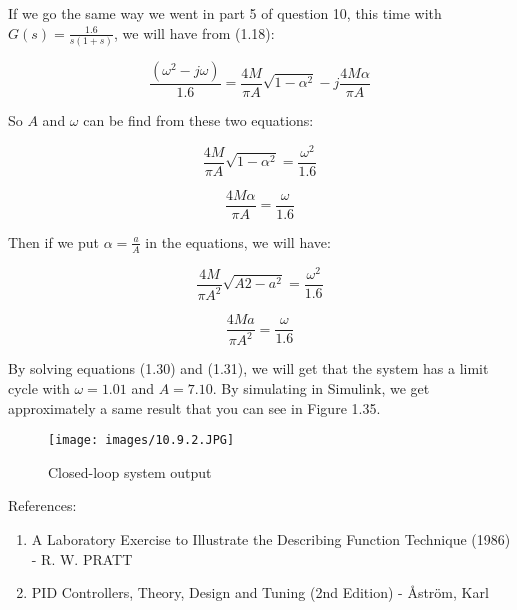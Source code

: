 \documentclass[11pt]{scrartcl} %
\begin{document}
 If we go the same way we went in part 5 of question 10, this time with $G(s)=\frac{1.6}{s(1+s)}$, we will have from (1.18):

\begin{equation}
    \frac{(\omega ^2 - j\omega)}{1.6} =  \frac{4M}{\pi A} \sqrt{1-\alpha ^2} - j\frac{4M\alpha}{\pi A}
\end{equation}

So $A$ and $\omega$ can be find from these two equations:

\begin{equation}
    \frac{4M}{\pi A} \sqrt{1-\alpha ^2} = \frac{\omega ^2}{1.6} 
\end{equation}

\begin{equation}
    \frac{4M\alpha}{\pi A} = \frac{\omega}{1.6}
\end{equation}

Then if we put $\alpha = \frac{a}{A}$ in the equations, we will have:

\begin{equation}
    \frac{4M}{\pi A^2} \sqrt{A2- a^2} = \frac{\omega ^2}{1.6} 
\end{equation}

\begin{equation}
    \frac{4M a}{\pi A^2} = \frac{\omega}{1.6}
\end{equation}

By solving equations (1.30) and (1.31), we will get that the system has a limit cycle with $\omega = 1.01$ and $A = 7.10$. By simulating in Simulink, we get approximately a same result that you can see in Figure 1.35.
 
\begin{figure}[H]
	\centering
	\texttt{[image: images/10.9.2.JPG]}
	\caption{Closed-loop system output}
\end{figure}
\newpage
{\huge References:}
\begin{enumerate}
	\item A Laboratory Exercise to Illustrate the Describing Function Technique (1986) - R. W. PRATT
	\item PID Controllers, Theory, Design and Tuning (2nd Edition) - Åström, Karl
\end{enumerate}
\end{document}
